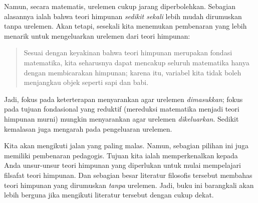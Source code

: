 \documentclass[../../../include/open-logic-section]{subfiles}
\begin{document}
Namun, secara matematis, urelemen cukup jarang diperbolehkan. Sebagian
alasannya ialah bahwa teori himpunan \emph{sedikit sekali} lebih mudah
dirumuskan tanpa urelemen. Akan tetapi, sesekali kita menemukan pembenaran
yang lebih menarik untuk mengeluarkan urelemen dari teori himpunan:
\begin{quote}
	Sesuai dengan keyakinan bahwa teori himpunan merupakan fondasi matematika,
	kita seharusnya dapat mencakup seluruh matematika hanya dengan membicarakan
	himpunan; karena itu, variabel kita tidak boleh menjangkau objek
	seperti sapi dan babi.
	\citep[p.~8]{Kunen1980}
\end{quote}
Jadi, fokus pada keterterapan menyarankan agar urelemen \emph{dimasukkan};
fokus pada tujuan fondasional yang reduktif (mereduksi matematika menjadi
teori himpunan murni) mungkin menyarankan agar urelemen \emph{dikeluarkan}.
Sedikit kemalasan juga mengarah pada pengeluaran urelemen.

Kita akan mengikuti jalan yang paling malas. Namun, sebagian pilihan ini juga
memiliki pembenaran pedagogis. Tujuan kita ialah memperkenalkan kepada Anda
unsur-unsur teori himpunan yang diperlukan untuk mulai mempelajari filsafat
teori himpunan. Dan sebagian besar literatur filosofis tersebut membahas
teori himpunan yang dirumuskan \emph{tanpa} urelemen. Jadi, buku ini barangkali
akan lebih berguna jika mengikuti literatur tersebut dengan cukup dekat.
\end{document}
